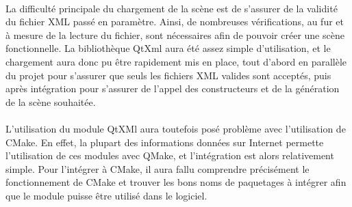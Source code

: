 \paragraph{}
La difficulté principale du chargement de la scène est de s'assurer de la validité du fichier XML passé en paramètre. Ainsi, de nombreuses vérifications, au fur et à mesure de la lecture du fichier, sont nécessaires afin de pouvoir créer une scène fonctionnelle. La bibliothèque QtXml aura été assez simple d'utilisation, et le chargement aura donc pu être rapidement mis en place, tout d'abord en parallèle du projet pour s'assurer que seuls les fichiers XML valides sont acceptés, puis après intégration pour s'assurer de l'appel des constructeurs et de la génération de la scène souhaitée.

\paragraph{}
L'utilisation du module QtXMl aura toutefois posé problème avec l'utilisation de CMake. En effet, la plupart des informations données sur Internet permette l'utilisation de ces modules avec QMake, et l'intégration est alors relativement simple. Pour l'intégrer à CMake, il aura fallu comprendre précisément le fonctionnement de CMake et trouver les bons noms de paquetages à intégrer afin que le module puisse être utilisé dans le logiciel.


